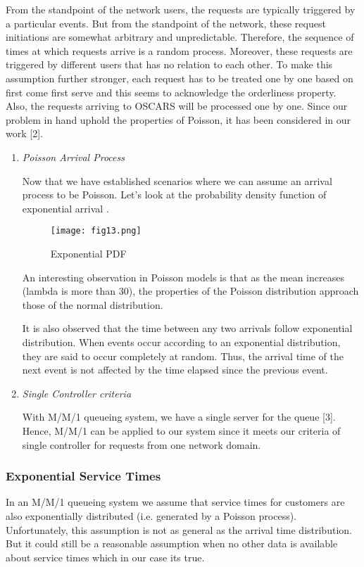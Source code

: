 \indent From the standpoint of the network users, the requests are typically triggered by a particular events. But from the standpoint of the network, these request initiations are somewhat arbitrary and unpredictable. Therefore, the sequence of times at which requests arrive is a random process. Moreover, these requests are triggered by different users that has no relation to each other. To make this assumption further stronger, each request has to be treated one by one based on first come first serve and this seems to acknowledge the orderliness property. Also, the requests arriving to OSCARS will be processed one by one. Since our problem in hand uphold the properties of Poisson, it has been considered in our work [2].

\begin{enumerate}[label=(\alph*),leftmargin=*]
\item\textit {Poisson Arrival Process}
	
Now that we have established scenarios where we can assume an arrival process to be Poisson. Let's look at the probability density function of exponential arrival . 

\begin{figure}[H]
\centering
\texttt{[image: fig13.png]}
\caption{Exponential PDF}
\label{fig:expoPDF}
\end{figure}	
	
\hspace{5mm}  An interesting observation in Poisson models is that as the mean increases (lambda is more than 30), the properties of the Poisson distribution approach those of the normal distribution.

\hspace{5mm} It is also observed that the time between any two arrivals follow exponential distribution. When events occur according to an exponential distribution, they are said to occur completely at random. Thus, the arrival time of the next event is not affected by the time elapsed since the previous event. 

\item\textit{Single Controller criteria}

With M/M/1 queueing system, we have a single server for the queue [3]. Hence, M/M/1 can be applied to our system since it meets our criteria of single controller for requests from one network domain.
\end{enumerate}

\subsubsection {Exponential Service Times}
In an M/M/1 queueing system we assume that service times for customers are also exponentially distributed (i.e. generated by a Poisson process). Unfortunately, this assumption is not as general as the arrival time distribution. But it could still be a reasonable assumption when no other data is available about service times which in our case its true.


